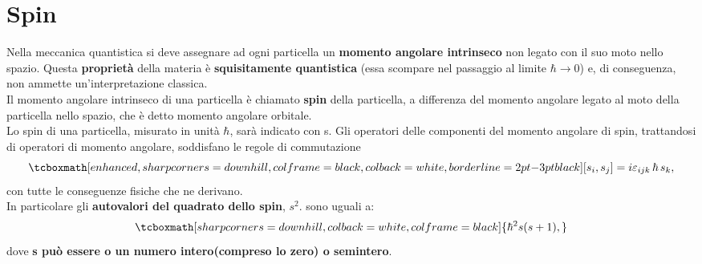 \documentclass[a4paper,12pt,oneside]{book}
\newcommand*{\myfont}{\fontfamily{ppl}\selectfont}
\begin{document}
\fancypagestyle{plain}{%
\fancyhf{} %
\fancyfoot[C]{\bfseries \myfont{\thepage}} %
\renewcommand{\headrulewidth}{0pt}
\renewcommand{\footrulewidth}{0pt}}

\fancypagestyle{VS}{
\headheight = 15pt
\lhead[\myfont{\textit{\textbf{\thechapter\nouppercase{\leftmark}}}}]{\myfont{\textit{\textbf{\nouppercase{\leftmark}}}}}
\chead[]{}
\rhead[\myfont{\textbf{\thepage}}]{\myfont{\textbf{\thepage}}}

\lfoot[]{}
\cfoot[]{}
\rfoot[]{}
}



\pagestyle{VS}
\setcounter{chapter}{17}
\setcounter{page}{186}
\chapter{Spin}
Nella meccanica quantistica si deve assegnare ad ogni particella un \textbf{momento angolare intrinseco} non legato con il suo moto nello spazio. Questa \textbf{proprietà} della materia è \textbf{squisitamente quantistica} (essa scompare nel passaggio al limite $\hbar\rightarrow0$) e, di conseguenza, non ammette un'interpretazione classica.\\

Il momento angolare intrinseco di una particella è chiamato \textbf{spin} della particella, a differenza del momento angolare legato al moto della particella nello spazio, che è detto momento angolare orbitale.\\

Lo spin di una particella, misurato in unità $\hbar$, sarà indicato con s. Gli operatori delle componenti del momento angolare di spin, trattandosi di operatori di momento angolare, soddisfano le regole di commutazione
	\begin{equation}
		\tcboxmath[enhanced, sharp corners=downhill, colframe=black, colback=white, borderline={2pt}{-3pt}{black}]{
			[s_{i},s_{j}]=i\varepsilon_{ijk}\,\hbar\, s_{k} ,
			}
	\label{18.1}
	\end{equation}
con tutte le conseguenze fisiche che ne derivano.\\

In particolare gli \textbf{autovalori del quadrato dello spin}, $s^{2}$. sono uguali a:
	\begin{equation}
		\tcboxmath[sharp corners=downhill, colback=white, colframe=black]{
			\hbar^{2}s(s+1) ,
			}
	\end{equation}
dove \textbf{s può essere o un numero intero(compreso lo zero) o semintero}.\\
\end{document}
